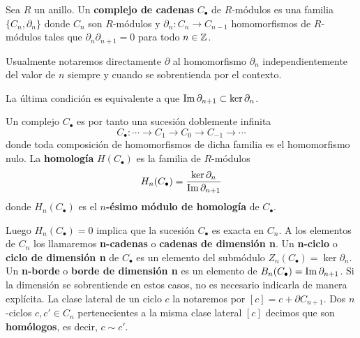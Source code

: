 \begin{definicion}
	Sea \(R\) un anillo. Un \textbf{complejo de cadenas} \(C_{\bullet}\) de \(R\)-módulos
	es una familia \(\{C_{n}, \partial_{n}\}\) donde \(C_{n}\) son \(R\)-módulos y \(\partial
	_{n} : C_{n} \rightarrow C_{n-1}\) homomorfismos de \(R\)-módulos tales que \(\partial
	_{n} \partial_{n+1}= 0\) para todo \(n \in \mathbb{Z}\).
\end{definicion}
\begin{nota}
	Usualmente notaremos directamente \(\partial\) al homomorfismo \(\partial_{n}\) independientemente
	del valor de \(n\) siempre y cuando se sobrentienda por el contexto.
\end{nota}
\begin{observacion}
	La última condición es equivalente a que \(\operatorname{Im}{\partial_{n+1}}\subset \ker{\partial_n}\).
\end{observacion}
Un complejo \(C_{\bullet}\) es por tanto una sucesión doblemente infinita
\[
C_{\bullet}: \cdots \rightarrow C_{1}\rightarrow C_{0} \rightarrow C_{-1}\rightarrow
\cdots
\]
donde toda composición de homomorfismos de dicha familia es el homomorfismo nulo.
La \textbf{homología} \(H(C_{\bullet})\) es la familia de \(R\)-módulos
\[
H_{n}(C_{\bullet}) = \frac{\ker \partial_{n}}{\operatorname{Im} \partial_{n+1}}
\]
donde \(H_{n}(C_{\bullet})\) es el \textbf{\(n\)-ésimo módulo de homología} de \(C_{\bullet}\).

Luego \(H_{n}(C_{\bullet})=0\) implica que la sucesión \(C_{\bullet}\) es exacta en \(C
_{n}\). A los elementos de \(C_{n}\) los llamaremos \textbf{n-cadenas} o \textbf{cadenas
	de dimensión n}. Un \textbf{n-ciclo} o \textbf{ciclo de dimensión n} de \(C_{\bullet}\)
es un elemento del submódulo \(Z_{n}(C_{\bullet}) = \ker \partial_{n}\). Un
\textbf{n-borde} o \textbf{borde de dimensión n} es un elemento de
\(B_{n}(C_{\bullet})= \operatorname{Im}{\partial_{n+1}}\). Si la dimensión se sobrentiende en estos
casos, no es necesario indicarla de manera explícita. La clase lateral de un ciclo
\(c\) la notaremos por \([c] = c + \partial C_{n+1}\). Dos \(n\)-ciclos
\(c,c' \in C_{n}\) pertenecientes a la misma clase lateral \([c]\) decimos que son
\textbf{homólogos}, es decir, \(c \sim c'\).

